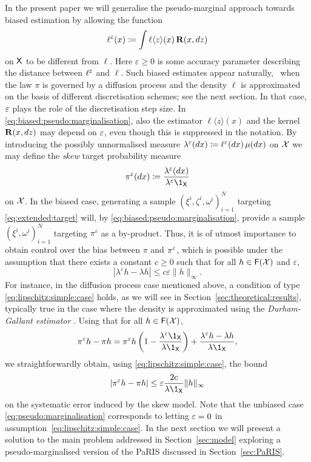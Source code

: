 In the present paper we will generalise the pseudo-marginal approach towards biased estimation by allowing the function 
\begin{equation} \label{eq:biased:pseudo:marginalisation}
    \ell^\precpar(x) \eqdef \int \ell \langle z \rangle(x) \, \mathbf{R}(x, \rmd z)
\end{equation}
on $\mathsf{X}$ to be different from $\ell$. Here $\varepsilon \geq 0$ is some accuracy parameter describing the distance between $\ell^\varepsilon$ and $\ell$. Such biased estimates appear naturally, \eg\ when the law $\pi$ is governed by a diffusion process and the density $\ell$ is approximated on the basis of different discretisation schemes; see the next section. In that case, $\varepsilon$ plays the role of the discretisation step size. In \eqref{eq:biased:pseudo:marginalisation}, also the estimator $\ell \langle z \rangle(x)$ and the kernel $\mathbf{R}(x, d z)$ may depend on $\varepsilon$, even though this is suppressed in the notation. By introducing the possibly unnormalised measure $\lambda^\varepsilon(d x) \coloneqq \ell^\varepsilon(d x) \, \mu(d x)$ on $\mathcal{X}$ we may define the \emph{skew} target probability measure
$$
    \pi^\varepsilon(\rmd x) \eqdef \frac{\lambda^\precpar(\rmd x)}{\lambda^\precpar \1_\Xset}
$$
on $\mathcal{X}$. In the biased case, generating a sample $(\xi^i, \zeta^i, \omega^i)_{i = 1}^N$ targeting \eqref{eq:extended:target} will, by \eqref{eq:biased:pseudo:marginalisation}, provide a sample $(\xi^i, \omega^i)_{i = 1}^N$ targeting $\pi^\varepsilon$ as a by-product. Thus, it is of utmost importance to obtain control over the bias between $\pi$ and $\pi^\varepsilon$, which is possible under the assumption that there exists a constant $c \geq 0$ such that for all $h \in \mathsf{F}(\mathcal{X})$ and $\varepsilon$,   
\begin{equation} \label{eq:lipschitz:simple:case}
    \left| \lambda^\varepsilon h - \lambda h \right| \leq c \varepsilon \| h \|_\infty. 
\end{equation}
For instance, in the diffusion process case mentioned above, a condition of type \eqref{eq:lipschitz:simple:case} holds, as we will see in Section~\ref{sec:theoretical:results}, typically true in the case where the density is approximated using the \emph{Durham-Gallant estimator} \cite{durham:gallant:2002}. Using that for all $h \in \mathsf{F}(\mathcal{X})$,  
$$
    \pi^\precpar h - \pi h = \pi^\precpar h \left( 1 - \frac{\lambda^\varepsilon \1_\Xset}{\lambda \1_\Xset} \right) + \frac{\lambda^\precpar h - \lambda h}{\lambda \1_\Xset}, 
$$
we straightforwardly obtain, using \eqref{eq:lipschitz:simple:case}, the bound  
$$
    \left| \pi^\precpar h - \pi h \right| \leq \precpar \frac{2 c}{\lambda \1_\Xset} \| h \|_\infty
$$
on the systematic error induced by the skew model. Note that the unbiased case \eqref{eq:pseudo:marginalisation} corresponds to letting $\varepsilon = 0$ in assumption~\eqref{eq:lipschitz:simple:case}. In the next section we will present a solution to the main problem addressed in Section~\ref{sec:model} exploring a pseudo-marginalised version of the PaRIS discussed in Section~\ref{sec:PaRIS}. 

